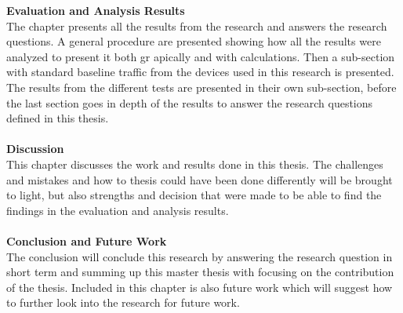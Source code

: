 \textbf{Evaluation and Analysis Results}
\\
The chapter presents all the results from the research and answers the research questions. A general procedure are presented showing how all the results were analyzed to present it both gr apically and with calculations. Then a sub-section with standard baseline traffic from the devices used in this research is presented. The results from the different tests are presented in their own sub-section, before the last section goes in depth of the results to answer the research questions defined in this thesis.  
\\\\
\textbf{Discussion}
\\
This chapter discusses the work and results done in this thesis. The challenges and mistakes and how to thesis could have been done differently will be brought to light, but also strengths and decision that were made to be able to find the findings in the evaluation and analysis results. 
\\\\
\textbf{Conclusion and Future Work}
\\
The conclusion will conclude this research by answering the research question in short term and summing up this master thesis with focusing on the contribution of the thesis. Included in this chapter is also future work which will suggest how to further look into the research for future work.